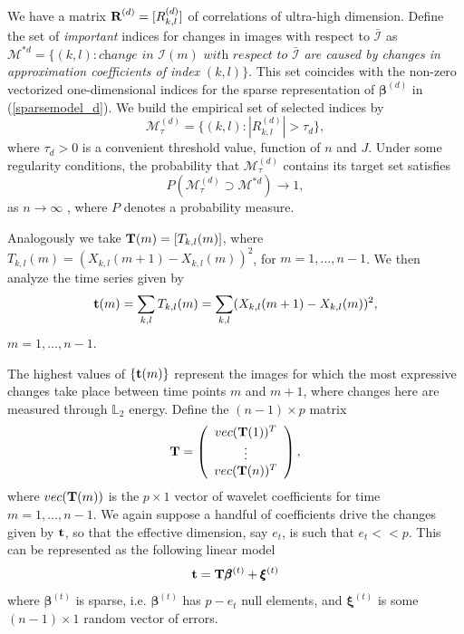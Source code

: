 \documentclass[journal]{IEEEtran}
\newcommand{\vbeta}{\pmb{\beta}}
\newcommand{\vxi}{\pmb{\xi}}
\newcommand{\vR}{{\textbf R}}
\newcommand{\vT}{{\textbf T}}
\newcommand{\vt}{{\textbf t}}
\begin{document}
We have a matrix $\vR^{(d)}=[R_{k,l}^{(d)}]$ of correlations of ultra-high dimension. Define the set of 
{\it important} indices for changes in images with respect to $\bar{\mathcal I}$ as 
$\mathcal{M}^{*d}=\{(k,l): \textit{change in } \mathcal{I}(m)\textit{ with respect to}$ $\bar{\mathcal{I}}$ \textit{are caused by changes in approximation coefficients of index} $(k,l)\}$.  This set coincides with the non-zero vectorized one-dimensional indices for the sparse representation of $\vbeta^{(d)}$ in (\ref{sparsemodel_d}). 
We build the empirical set of selected indices by
\begin{equation}
\mathcal{M}_{\tau}^{(d)}=\{(k,l):|R_{k,l}^{(d)}|>\tau_d\},
\label{def_Mtaud}
\end{equation}
where $\tau_d>0$ is a convenient threshold value, function of $n$ and $J$. Under some regularity conditions, the probability that $\mathcal{M}_{\tau}^{(d)}$ contains its target set satisfies
\[
P(\mathcal{M}_{\tau}^{(d)}\supset\mathcal{M}^{*d})\rightarrow 1,
\]
as $n\rightarrow\infty$ \cite{fan2020statistical}, where $P$ denotes a probability measure.


Analogously we take $\vT(m) = [T_{k,l}(m)]$, where $T_{k,l}(m)=(X_{k,l}(m+1)-X_{k,l}(m))^2$, for $m=1,\ldots,n-1$. We then analyze the time series given by
\begin{equation}
\vt(m)= \sum_{k,l}T_{k,l}(m) = \sum_{k,l}(X_{k,l}(m+1) - X_{k,l}(m))^2,
\label{eq_deftm}
\end{equation}
$m=1,\ldots,n-1$.

The highest values of $\{\vt(m)\}$ represent the images for which the most expressive changes take place between time points $m$ and $m+1$, where changes here are measured through $\mathbb{L}_2$ energy. Define the  $(n-1)\times p$ matrix
\begin{equation}
 \vT=\left(
 \begin{array}{c}
 vec(\vT(1))^T\\
 \vdots\\
 vec(\vT(n))^T\\
 \end{array}
 \right),
\label{eq_defmatrixT}
\end{equation}
where $vec(\vT(m))$ is the $p\times 1$ vector of wavelet coefficients for time $m=1,\ldots,n-1$. We again suppose a handful of coefficients drive the changes given by $\vt$, so that the effective dimension, say $e_t$, is such that $e_t<<p$. This can be represented as the following linear model
\begin{equation} 
\vt=\vT\vbeta^{(t)}+\vxi^{(t)}
\label{sparsemodel_t}
\end{equation}
where $\vbeta^{(t)}$ is sparse, i.e. $\vbeta^{(t)}$ has $p-e_t$ null elements, and $\vxi^{(t)}$ is some $(n-1)\times 1$ random vector of errors.
\end{document}
